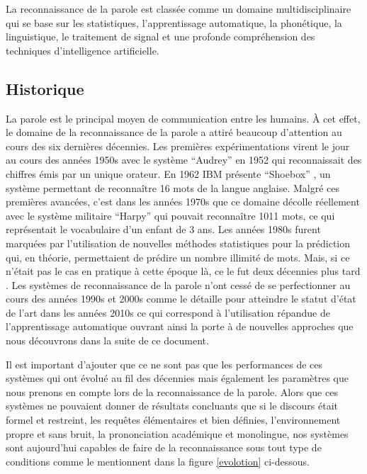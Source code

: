 La reconnaissance de la parole est classée comme un domaine multidisciplinaire qui se base sur les statistiques, l'apprentissage automatique, la phonétique, la linguistique, le traitement de signal et une profonde compréhension des techniques d'intelligence artificielle.

\subsection{Historique}
La parole est le principal moyen de communication entre les humains. À cet effet, le domaine de la reconnaissance de la parole a attiré beaucoup d'attention au cours des six dernières décennies. Les premières expérimentations virent le jour au cours des années 1950s avec le système “Audrey” en 1952 \cite{audrey} qui reconnaissait des chiffres émis par un unique orateur. En 1962 IBM présente “Shoebox” \cite{ibmshoebox}, un système permettant de reconnaître 16 mots de la langue anglaise. Malgré ces premières avancées, c'est dans les années 1970s que ce domaine décolle réellement avec le système militaire “Harpy” \cite{harpy} qui pouvait reconnaître 1011 mots, ce qui représentait le vocabulaire d'un enfant de 3 ans. Les années 1980s furent marquées par l'utilisation de nouvelles méthodes statistiques pour la prédiction qui, en théorie, permettaient de prédire un nombre illimité de mots. Mais, si ce n'était pas le cas en pratique à cette époque là, ce le fut deux décennies plus tard \cite{speechrechist}. Les systèmes de reconnaissance de la parole n'ont cessé de se perfectionner au cours des années 1990s et 2000s comme le détaille \cite{audreysiri} pour atteindre le statut d'état de l'art dans les années 2010s ce qui correspond à l'utilisation répandue de l'apprentissage automatique ouvrant ainsi la porte à de nouvelles approches que nous découvrons dans la suite de ce document. 

Il est important d'ajouter que ce ne sont pas que les performances de ces systèmes qui ont évolué au fil des décennies mais également les paramètres que nous prenons en compte lors de la reconnaissance de la parole. Alors que ces systèmes ne pouvaient donner de résultats concluants que si le discours était formel et restreint, les requêtes élémentaires et bien définies, l'environnement propre et sans bruit, la prononciation académique et monolingue, nos systèmes sont aujourd'hui capables de faire de la reconnaissance sous tout type de conditions comme le mentionnent \cite{deeplearningapproach} dans la figure \ref{evolotion} ci-dessous. 

